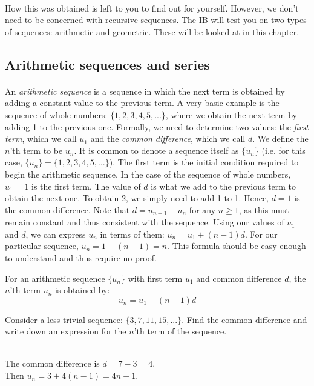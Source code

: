\documentclass[12pt, a4paper, titlepage, twoside]{article}
\newcounter{excount}[subsection]
\begin{document}
	\paragraph{}
	How this was obtained is left to you to find out for yourself. However, we don't need to be concerned with recursive sequences.
	The IB will test you on two types of sequences: arithmetic and geometric. These will be looked at in this chapter.
	
	\subsection{Arithmetic sequences and series}
	
	\paragraph{}
	An \textit{arithmetic sequence} is a sequence in which the next term is obtained by adding a constant value to the previous term.
	A very basic example is the sequence of whole numbers: $\{1,2,3,4,5,...\}$, where we obtain the next term by adding 1 to the
	previous one. Formally, we need to determine two values: the \textit{first term}, which we call $u_1$ and the \textit{common 
	difference}, which we call $d$. We define the $n$'th term to be $u_n$. It is common to denote a sequence itself as $\{u_n\}$
	(i.e. for this case, $\{u_n\} = \{1,2,3,4,5,...\}$).
	The first term is the initial condition required to begin the
	arithmetic sequence. In the case of the sequence of whole numbers, $u_1 = 1$ is the first term. The value of $d$ is what we
	add to the previous term to obtain the next one. To obtain 2, we simply need to add 1 to 1. Hence, $d=1$ is the common difference.
	Note that $d = u_{n+1} - u_n$ for any $n \geqslant 1$, as this must remain constant and thus consistent with the sequence.
	Using our values of $u_1$ and $d$, we can express $u_n$ in terms of them: $u_n = u_1 + (n-1)d$. For our particular sequence,
	$u_n = 1 + (n-1) = n$. This formula should be easy enough to understand and thus require no proof.\\
	
	\begin{kp}
		For an arithmetic sequence $\{u_n\}$ with first term $u_1$ and common difference $d$, the $n$'th term $u_n$ is obtained by:	
		$$u_n = u_1 + (n-1)d$$
	\end{kp}
	
	\hfill
	
	\begin{ex}
		Consider a less trivial sequence: $\{3, 7, 11, 15,...\}$. Find the common difference and write down an expression for the
		$n$'th term of the sequence.\\
		
		\tcbline
		
		\hfill \\
		The common difference is $d = 7 - 3 = 4$. \\Then $u_n = 3 + 4(n-1) = 4n - 1$.		
	\end{ex}
	
\end{document}
